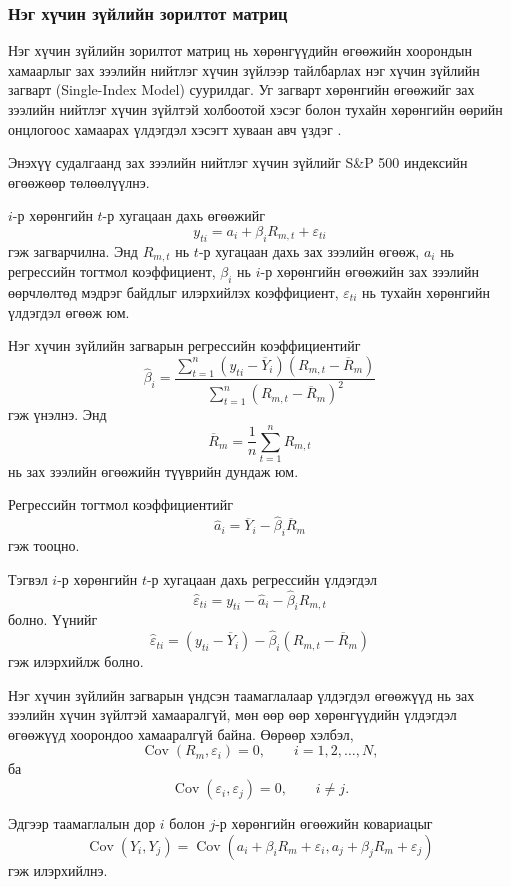 \subsubsection{Нэг хүчин зүйлийн зорилтот матриц}

Нэг хүчин зүйлийн зорилтот матриц нь хөрөнгүүдийн өгөөжийн
хоорондын хамаарлыг зах зээлийн нийтлэг хүчин зүйлээр
тайлбарлах нэг хүчин зүйлийн загварт (Single-Index Model)
суурилдаг. Уг загварт хөрөнгийн өгөөжийг зах зээлийн
нийтлэг хүчин зүйлтэй холбоотой хэсэг болон тухайн
хөрөнгийн өөрийн онцлогоос хамаарах үлдэгдэл хэсэгт
хуваан авч үздэг \citep{ledoitwolf2003}.

Энэхүү судалгаанд зах зээлийн нийтлэг хүчин зүйлийг
S\&P 500 индексийн өгөөжөөр төлөөлүүлнэ.

$i$-р хөрөнгийн $t$-р хугацаан дахь өгөөжийг
\[
y_{ti}
=
a_i+\beta_i R_{m,t}+\varepsilon_{ti}
\]
гэж загварчилна. Энд $R_{m,t}$ нь $t$-р хугацаан дахь
зах зээлийн өгөөж, $a_i$ нь регрессийн тогтмол
коэффициент, $\beta_i$ нь $i$-р хөрөнгийн өгөөжийн
зах зээлийн өөрчлөлтөд мэдрэг байдлыг илэрхийлэх
коэффициент, $\varepsilon_{ti}$ нь тухайн хөрөнгийн
үлдэгдэл өгөөж юм.

Нэг хүчин зүйлийн загварын регрессийн коэффициентийг
\[
\widehat{\beta}_i
=
\frac{
	\sum_{t=1}^{n}
	(y_{ti}-\overline{Y}_i)
	(R_{m,t}-\overline{R}_m)
}{
	\sum_{t=1}^{n}
	(R_{m,t}-\overline{R}_m)^2
}
\]
гэж үнэлнэ. Энд
\[
\overline{R}_m
=
\frac{1}{n}
\sum_{t=1}^{n}R_{m,t}
\]
нь зах зээлийн өгөөжийн түүврийн дундаж юм.

Регрессийн тогтмол коэффициентийг
\[
\widehat{a}_i
=
\overline{Y}_i
-
\widehat{\beta}_i\overline{R}_m
\]
гэж тооцно.

Тэгвэл $i$-р хөрөнгийн $t$-р хугацаан дахь
регрессийн үлдэгдэл
\[
\widehat{\varepsilon}_{ti}
=
y_{ti}
-
\widehat{a}_i
-
\widehat{\beta}_iR_{m,t}
\]
болно. Үүнийг
\[
\widehat{\varepsilon}_{ti}
=
(y_{ti}-\overline{Y}_i)
-
\widehat{\beta}_i
(R_{m,t}-\overline{R}_m)
\]
гэж илэрхийлж болно.

Нэг хүчин зүйлийн загварын үндсэн таамаглалаар
үлдэгдэл өгөөжүүд нь зах зээлийн хүчин зүйлтэй
хамааралгүй, мөн өөр өөр хөрөнгүүдийн үлдэгдэл
өгөөжүүд хоорондоо хамааралгүй байна. Өөрөөр хэлбэл,
\[
\operatorname{Cov}(R_m,\varepsilon_i)=0,
\qquad i=1,2,\ldots,N,
\]
ба
\[
\operatorname{Cov}(\varepsilon_i,\varepsilon_j)=0,
\qquad i\neq j.
\]

Эдгээр таамаглалын дор $i$ болон $j$-р хөрөнгийн
өгөөжийн ковариацыг
\[
\operatorname{Cov}(Y_i,Y_j)
=
\operatorname{Cov}
(a_i+\beta_iR_m+\varepsilon_i,
a_j+\beta_jR_m+\varepsilon_j)
\]
гэж илэрхийлнэ.

